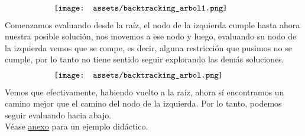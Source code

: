 \documentclass[10pt,a4paper]{article}
\begin{document}
\[\begin{minipage}[b]{0.7\textwidth}
    \texttt{[image: assets/backtracking\_arbol1.png]}
\end{minipage}\]
Comenzamos evaluando desde la raíz, el nodo de la izquierda cumple hasta ahora nuestra posible solución, nos movemos a ese nodo y luego, evaluando su nodo de la izquierda vemos que se rompe, es decir, alguna restricción que pusimos no se cumple, por lo tanto no tiene sentido seguir explorando las demás soluciones. 
\[\begin{minipage}[b]{0.7\textwidth}
    \texttt{[image: assets/backtracking\_arbol.png]}
\end{minipage}\]
Vemos que efectivamente, habiendo vuelto a la raíz, ahora sí encontramos un camino mejor que el camino del nodo de la izquierda. Por lo tanto, podemos seguir evaluando hacia abajo. \\
Véase \hyperref[subsec:backtracking_ex]{\underline{anexo}} para un ejemplo didáctico.
\end{document}
